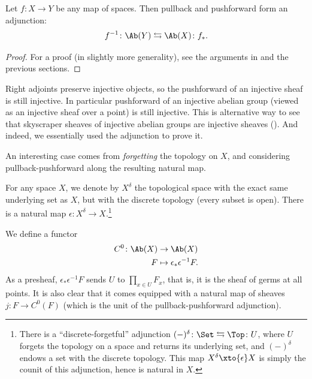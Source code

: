 \documentclass[11pt]{book}
\begin{document}
\begin{proposition}\label{prop:pullback-pushforward-adjunction} Let $f \colon X \to Y$ be any map of spaces. Then pullback and pushforward form an adjunction:
\begin{align*}
    f^{-1} \colon \Ab(Y) \leftrightarrows \Ab(X) \colon f_\ast.
\end{align*}
\end{proposition}
\begin{proof} For a proof (in slightly more generality), see the arguments in \cite[008P]{Stacks} and the previous sections.
\end{proof}

\begin{remark} Right adjoints preserve injective objects, so the pushforward of an injective sheaf is still injective. In particular pushforward of an injective abelian group (viewed as an injective sheaf over a point) is still injective. This is alternative way to see that skyscraper sheaves of injective abelian groups are injective sheaves (). And indeed, we essentially used the adjunction  to prove it.
\end{remark}

An interesting case comes from \emph{forgetting} the topology on $X$, and considering pullback-pushforward along the resulting natural map.

\begin{notation} For any space $X$, we denote by $X^\delta$ the topological space with the exact same underlying set as $X$, but with the discrete topology (every subset is open). There is a natural map $\epsilon \colon X^\delta \to X$.\footnote{There is a ``discrete-forgetful'' adjunction $(-)^\delta \colon \Set \leftrightarrows \Top \colon U$, where $U$ forgets the topology on a space and returns its underlying set, and $(-)^\delta$ endows a set with the discrete topology. This map $X^\delta \xto{\epsilon} X$ is simply the counit of this adjunction, hence is natural in $X$.}
\end{notation}

We define a functor
\begin{align*}
    C^0 \colon \Ab(X) &\to \Ab(X) \\
    F &\mapsto \epsilon_\ast \epsilon^{-1} F.
\end{align*}
%
As a presheaf, $\epsilon_\ast \epsilon^{-1} F$ sends $U$ to $\prod_{x\in U} F_x$, that is, it is the sheaf of germs at all points. It is also clear that it comes equipped with a natural map of sheaves $j \colon F \to C^0(F)$ (which is the unit of the pullback-pushforward adjunction).
\end{document}
